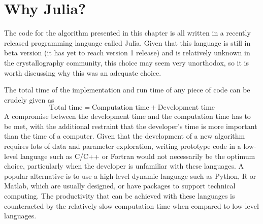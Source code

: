 \section{Why Julia?}
\label{sec:Why Julia?}
The code for the algorithm presented in this chapter is all written in a recently released programming language called Julia.
Given that this language is still in beta version (it has yet to reach version 1 release) and is relatively unknown in the crystallography community, this choice may seem very unorthodox, so it is worth discussing why this was an adequate choice.

The total time of the implementation and run time of any piece of code can be crudely given as
\begin{equation*}
    \text{Total time} = \text{Computation time} + \text{Development time}
\end{equation*}
A compromise between the development time and the computation time has to be met, with the additional restraint that the developer's time is more important than the time of a computer.
Given that the development of a new algorithm requires lots of data and parameter exploration, writing prototype code in a low-level language such as C/C++ or Fortran would not necessarily be the optimum choice, particularly when the developer is unfamiliar with these languages.
A popular alternative is to use a high-level dynamic language such as Python, R or Matlab, which are usually designed, or have packages to support technical computing.
The productivity that can be achieved with these languages is counteracted by the relatively slow computation time when compared to low-level languages.

